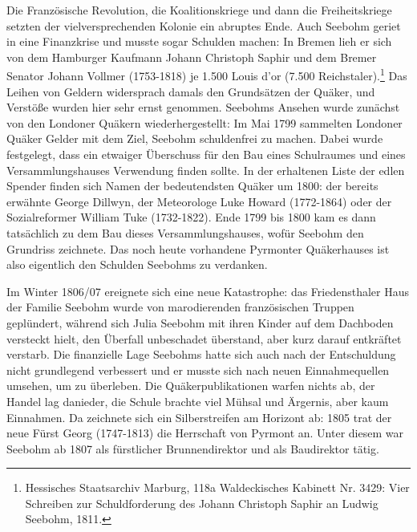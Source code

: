 \medskip

Die Französische Revolution, die
Koalitionskriege und dann die
Freiheitskriege setzten der vielversprechenden
Kolonie ein abruptes Ende. Auch Seebohm geriet in eine Finanzkrise und musste
sogar Schulden machen: In Bremen lieh er
sich von dem Hamburger Kaufmann Johann Christoph Saphir und dem Bremer Senator Johann Vollmer (1753-1818) je 1.500 Louis d’or (7.500 Reichstaler).\footnote{Hessisches
Staatsarchiv Marburg, 118a Waldeckisches Kabinett Nr. 3429: Vier
Schreiben zur Schuldforderung des Johann Christoph Saphir an Ludwig Seebohm,
1811.} Das Leihen von
Geldern widersprach damals den Grundsätzen der Quäker,
und Verstöße wurden hier sehr ernst genommen. Seebohms Ansehen wurde zunächst
von den Londoner Quäkern wiederhergestellt: Im
Mai 1799 sammelten Londoner Quäker Gelder mit dem Ziel, Seebohm schuldenfrei zu
machen. Dabei wurde festgelegt, dass ein etwaiger Überschuss für den Bau eines
Schulraumes und eines Versammlungshauses Verwendung
finden sollte. In der erhaltenen Liste der edlen Spender finden sich Namen der
bedeutendsten Quäker um 1800: der bereits erwähnte George
Dillwyn, der Meteorologe Luke
Howard (1772-1864) oder der
Sozialreformer William Tuke (1732-1822). Ende
1799 bis 1800 kam es dann tatsächlich zu dem Bau dieses Versammlungshauses,
wofür Seebohm den Grundriss zeichnete. Das noch heute vorhandene Pyrmonter
Quäkerhauses ist also eigentlich den Schulden Seebohms zu
verdanken.

\medskip

Im Winter 1806/07 ereignete sich eine neue Katastrophe: das Friedensthaler Haus
der Familie Seebohm wurde von marodierenden französischen Truppen
geplündert, während sich Julia
Seebohm mit ihren Kinder auf dem Dachboden
versteckt hielt, den Überfall unbeschadet überstand, aber kurz darauf entkräftet
verstarb. Die finanzielle Lage Seebohms hatte sich auch nach der Entschuldung
nicht grundlegend verbessert und er musste sich nach neuen Einnahmequellen
umsehen, um zu überleben. Die Quäkerpublikationen warfen nichts ab, der Handel
lag danieder, die Schule brachte viel Mühsal und Ärgernis, aber kaum Einnahmen.
Da zeichnete sich ein Silberstreifen am Horizont ab: 1805 trat der neue Fürst
Georg (1747-1813) die Herrschaft von Pyrmont an.
Unter diesem war Seebohm ab 1807 als fürstlicher Brunnendirektor und als
Baudirektor tätig.


